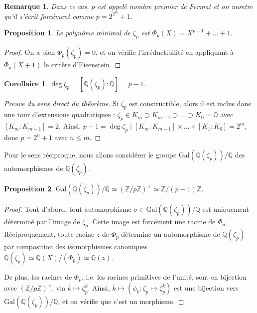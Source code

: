 \documentclass[a4paper, 11pt]{article}
\def\Z{\mathbb{Z}}
\def\Q{\mathbb{Q}}
\newtheorem*{proposition}{Proposition}
\newtheorem*{remark}{Remarque}
\newtheorem*{corollary}{Corollaire}
\begin{document}
\begin{remark}
  Dans ce cas, $p$ est appelé \emph{nombre premier de Fermat} et on montre qu'il
  s'écrit forcément comme $p = 2^{2^m} + 1$.
\end{remark}

\begin{proposition}
  Le polynôme minimal de $\zeta_p$ est $\Phi_p(X) = X^{p-1} + \ldots + 1$.
\end{proposition}
\begin{proof}
  On a bien $\Phi_p(\zeta_p) = 0$, et on vérifie l'irréductibilité en appliquant
  à $\Phi_p(X+1)$ le critère d'Eisenstein.
\end{proof}
\begin{corollary}
  $\deg \zeta_p = [\Q(\zeta_p) : \Q] = p - 1$.
\end{corollary}

\begin{proof}[Preuve du sens direct du théorème]
  Si $\zeta_p$ est constructible, alors il est inclus dans une tour d'extensions
  quadratiques : $\zeta_p \in K_m \supset K_{m-1} \supset \ldots \supset K_0 =
  \Q$ avec $[K_m : K_{m-1}] = 2$. Ainsi, $p - 1 = \deg \zeta_p \mid [K_m :
  K_{m-1}] \times \ldots \times [K_1 : K_0] = 2^m$, donc $p = 2^n + 1$ avec $n
  \leq m$.
\end{proof}

Pour le sens réciproque, nous allons considérer le groupe
$\mathrm{Gal}(\Q(\zeta_p))/\Q$ des automorphismes de $\Q(\zeta_p)$.

\begin{proposition}
  $\mathrm{Gal}(\Q(\zeta_p))/\Q \simeq (\Z/p\Z)^\times \simeq \Z/(p-1)\Z$.
\end{proposition}
\begin{proof}
  Tout d'abord, tout automorphisme $\sigma \in \mathrm{Gal}(\Q(\zeta_p))/\Q$ est
  uniquement déterminé par l'image de $\zeta_p$. Cette image est forcément une
  racine de $\Phi_p$. Réciproquement, toute racine $z$ de $\Phi_p$ détermine un
  automorphisme de $\Q(\zeta_p)$ par composition des isomorphismes canoniques
  $\Q(\zeta_p) \simeq \Q(X)/(\Phi_p) \simeq \Q(z)$.

  De plus, les racines de $\Phi_p$, i.e. les racines primitives de l'unité, sont
  en bijection avec $(\Z/p\Z)^\times$, via $\bar{k} \mapsto \zeta_p^k$. Ainsi,
  $\bar{k} \mapsto (\phi_k : \zeta_p \mapsto \zeta_p^k)$ est une bijection vers
  $\mathrm{Gal}(\Q(\zeta_p))/\Q$, et on vérifie que c'est un morphisme.
\end{proof}
\end{document}
